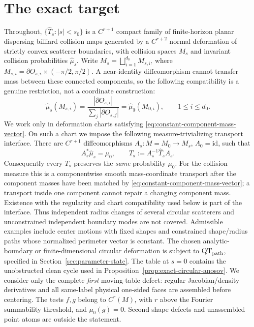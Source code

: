 \documentclass[11pt]{article}
\begin{document}
\section{The exact target}

Throughout, $\{\widehat T_s:|s|<s_0\}$ is a $C^{r+1}$ compact family of
finite-horizon planar dispersing billiard collision maps generated by a
$C^{r+2}$ normal deformation of strictly convex scatterer boundaries, with
collision spaces $M_s$ and invariant collision probabilities
$\widehat\mu_s$.  Write
$M_s=\bigsqcup_{i=1}^{d_0}M_{s,i}$, where
$M_{s,i}=\partial O_{s,i}\times(-\pi/2,\pi/2)$.  A near-identity
diffeomorphism cannot transfer mass between these connected components, so
the following compatibility is a genuine restriction, not a coordinate
construction:
\begin{equation}
\label{eq:constant-component-mass-vector}
 \widehat\mu_s(M_{s,i})
 =\frac{|\partial O_{s,i}|}{\sum_j|\partial O_{s,j}|}
 =\widehat\mu_0(M_{0,i}),\qquad 1\le i\le d_0.
\end{equation}
We work only in deformation charts satisfying
\eqref{eq:constant-component-mass-vector}.  On such a chart we impose the
following measure-trivializing transport interface.  There are $C^{r+1}$ diffeomorphisms
$A_s:M=M_0\to M_s$, $A_0=\mathrm{id}$, such that
\begin{equation}
\label{eq:measure-trivializing-gauge}
 A_s^*\widehat\mu_s=\mu_0,\qquad
 T_s:=A_s^{-1}\widehat T_sA_s .
\end{equation}
Consequently every $T_s$ preserves the \emph{same} probability $\mu_0$.
For the collision measure this is a componentwise smooth mass-coordinate
transport after the component masses have been matched by
\eqref{eq:constant-component-mass-vector}; a transport inside one component
cannot repair a changing component mass.  Existence with the regularity and
chart compatibility used below is part of the interface.  Thus independent
radius changes of several circular scatterers and unconstrained independent
boundary modes are not covered.  Admissible examples include center motions
with fixed shapes and constrained shape/radius paths whose normalized
perimeter vector is constant.  The chosen analytic-boundary or
finite-dimensional circular deformation is subject to
$\mathrm{QT}_{\rm path}$, specified in
Section~\ref{sec:parameter-state}.  The table at $s=0$ contains the
unobstructed clean cycle used in
Proposition~\ref{prop:exact-circular-anosov}.  We consider only the complete
\emph{first} moving-table defect: regular Jacobian/density derivatives and all
same-label physical one-sided faces are assembled before centering.  The tests
$f,g$ belong to $C^r(M)$, with $r$ above the Fourier summability threshold,
and $\mu_0(g)=0$.  Second shape defects and unassembled point atoms are outside
the statement.
\end{document}
